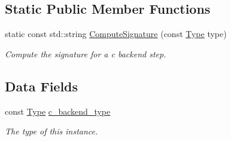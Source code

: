 \subsection*{Static Public Member Functions}
\begin{DoxyCompactItemize}
\item 
static const std\+::string \hyperlink{classCBackend_a25f706fe1466ee3c15d680c21f1d3025}{Compute\+Signature} (const \hyperlink{classCBackend_abadfd9ef309ba4d12e648fe2e3fff08b}{Type} type)
\begin{DoxyCompactList}\small\item\em Compute the signature for a c backend step. \end{DoxyCompactList}\end{DoxyCompactItemize}
\subsection*{Data Fields}
\begin{DoxyCompactItemize}
\item 
const \hyperlink{classCBackend_abadfd9ef309ba4d12e648fe2e3fff08b}{Type} \hyperlink{classCBackend_a2aab793665999e9eb573a5fd10d88dd8}{c\+\_\+backend\+\_\+type}
\begin{DoxyCompactList}\small\item\em The type of this instance. \end{DoxyCompactList}\end{DoxyCompactItemize}
